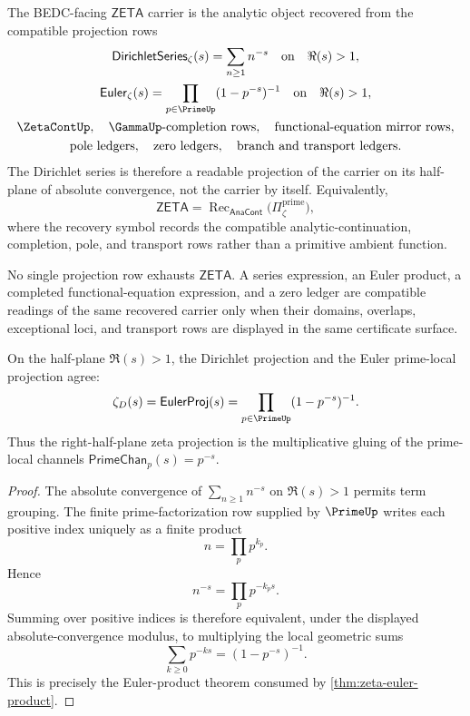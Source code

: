 \begin{definition}
\label{def:rh-zeta-recovery-carrier}
The BEDC-facing $\mathsf{ZETA}$ carrier is the analytic object recovered from
the compatible projection rows
$$
\begin{gathered}
\mathsf{DirichletSeries}_{\zeta}(s)=\sum_{n\geq 1} n^{-s}
\quad\text{on}\quad \Re(s)>1,\\
\mathsf{Euler}_{\zeta}(s)=\prod_{p\in\PrimeUp}(1-p^{-s})^{-1}
\quad\text{on}\quad \Re(s)>1,\\
\ZetaContUp,\quad
\GammaUp\text{-completion rows},\quad
\text{functional-equation mirror rows},\\
\text{pole ledgers},\quad
\text{zero ledgers},\quad
\text{branch and transport ledgers}.
\end{gathered}
$$
The Dirichlet series is therefore a readable projection of the carrier on its
half-plane of absolute convergence, not the carrier by itself.
Equivalently,
$$
\mathsf{ZETA}
=
\operatorname{Rec}_{\mathsf{AnaCont}}
\bigl(\Pi_{\zeta}^{\mathrm{prime}}\bigr),
$$
where the recovery symbol records the compatible analytic-continuation,
completion, pole, and transport rows rather than a primitive ambient
function.
\end{definition}

\begin{principle}
\label{prin:rh-no-projection-exhausts-zeta}
No single projection row exhausts $\mathsf{ZETA}$.  A series expression, an
Euler product, a completed functional-equation expression, and a zero ledger
are compatible readings of the same recovered carrier only when their domains,
overlaps, exceptional loci, and transport rows are displayed in the same
certificate surface.
\end{principle}

\begin{proposition}
\label{prop:rh-euler-product-prime-local-gluing}
On the half-plane $\Re(s)>1$, the Dirichlet projection and the Euler
prime-local projection agree:
$$
\zeta_D(s)=\mathsf{EulerProj}(s)
=\prod_{p\in\PrimeUp}(1-p^{-s})^{-1}.
$$
Thus the right-half-plane zeta projection is the multiplicative gluing of the
prime-local channels $\mathsf{PrimeChan}_p(s)=p^{-s}$.
\end{proposition}

\begin{proof}
The absolute convergence of $\sum_{n\geq 1}n^{-s}$ on $\Re(s)>1$ permits
term grouping.  The finite prime-factorization row supplied by $\PrimeUp$
writes each positive index uniquely as a finite product
$$
n=\prod_p p^{k_p}.
$$
Hence
$$
n^{-s}=\prod_p p^{-k_ps}.
$$
Summing over positive indices is therefore equivalent, under the displayed
absolute-convergence modulus, to multiplying the local geometric sums
$$
\sum_{k\geq 0}p^{-ks}=(1-p^{-s})^{-1}.
$$
This is precisely the Euler-product theorem consumed by
\autoref{thm:zeta-euler-product}.
\end{proof}


